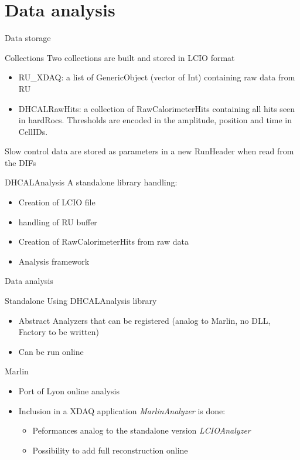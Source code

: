 \section{Data analysis}
\begin{frame}[shrink=5]{Data storage}
  \begin{block}{Collections}
    Two collections are built and stored in LCIO format
    \begin{itemize}
    \item RU\_XDAQ: a list of  GenericObject (vector of Int) containing raw data from RU 
    \item DHCALRawHits: a collection of RawCalorimeterHits containing all hits seen in hardRocs. Thresholds are encoded in the amplitude, position and time in CellIDs.
    \end{itemize}
    Slow control data are stored as parameters in a new RunHeader when read from the DIFs 
  \end{block}
  \pause 
  \begin{block}{DHCALAnalysis}
    A standalone library handling:
    \begin{itemize}
    \item Creation of LCIO file
    \item handling of RU buffer
    \item Creation of RawCalorimeterHits from raw data
    \item Analysis framework
    \end{itemize}

  \end{block}
\end{frame}

\begin{frame}[shrink=5]{Data analysis}
  \begin{block}{Standalone}
    Using DHCALAnalysis library
    \begin{itemize}
    \item Abstract Analyzers that can be registered (analog to Marlin, no DLL, Factory to be written)
    \item Can be run online
    \end{itemize}
    
  \end{block}
  \pause 
  \begin{block}{Marlin}
    \begin{itemize}
    \item Port of Lyon online analysis
    \item Inclusion in a XDAQ application {\sl MarlinAnalyzer} is done:
      \begin{itemize}
      \item Peformances analog to the standalone version { \sl LCIOAnalyzer}
      \item Possibility to add full reconstruction online 
      \end{itemize}
    \end{itemize}
  \end{block}

\end{frame}



